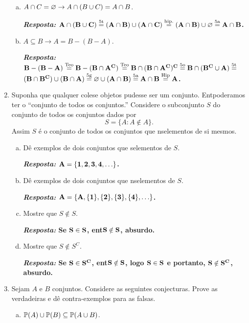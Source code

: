 \begin{enumerate}[{\bf 1.}]
\begin{enumerate}[a)]
\item $A\cap C=\varnothing \to A\cap(B\cup C)=A\cap B$.

{\bf{\it Resposta:} ${\bf A\cap(B\cup C)\stackrel{\text{5t}}{=}(A\cap B)\cup(A\cap C)\stackrel{\text{hip.}}{=}(A\cap B)\cup\varnothing\stackrel{\text{5a}}{=}A\cap B}$.}

\item $A\subseteq B \to A=B-(B-A)$.

{\bf{\it Resposta:} ${\bf B-(B-A)\stackrel{\text{Teo}}{=}B-(B\cap A^C)\stackrel{\text{Teo}}{=}B\cap(B\cap A^C)^C\stackrel{\text{5o}}{=}B\cap(B^C\cup A)\stackrel{\text{5t}}{=}}$ \\ ${\bf (B\cap B^C)\cup(B\cap A)\stackrel{\text{5g}}{=}\varnothing\cup(A\cap B)\stackrel{\text{5a}}{=}A\cap B\stackrel{\text{Hip}}{=}A}$.}
\end{enumerate}

\item Suponha que qualquer cole\cao se objetos pudesse ser um conjunto. Ent\ao poder\ih amos ter o ``conjunto de todos os conjuntos.'' Considere o subconjunto $S$ do conjunto de todos os conjuntos dados por
\[
S=\{A:A\notin A\}.
\]
Assim $S$ \'e o conjunto de todos os conjuntos que n\ao s\ao elementos de si mesmos.
\begin{enumerate}[a)]
\item D\^e exemplos de dois conjuntos que s\ao elementos de $S$.

{\bf{\it Resposta:} ${\bf A=\{1,2,3,4,\ldots\}}$.}

\item D\^e exemplos de dois conjuntos que n\ao s\ao elementos de $S$.

{\bf{\it Resposta:} ${\bf A=\{A,\{1\},\{2\},\{3\},\{4\},\ldots\}}$.}

\item Mostre que $S\notin S$.

{\bf{\it Resposta:} Se ${\bf S\in S}$, ent\ao ${\bf S\notin S}$, absurdo.}

\item Mostre que $S\notin S^C$.

{\bf{\it Resposta:} Se ${\bf S\in S^C}$, ent\ao ${\bf S\notin S}$, logo ${\bf S\in S}$ e portanto, ${\bf S\notin S^C}$, absurdo.}

\end{enumerate}

\item Sejam $A$ e $B$ conjuntos. Considere as seguintes conjecturas. Prove as verdadeiras e d\^e contra-exemplos para as falsas.
\begin{enumerate}[a)]
\item $\mathbb{P}(A)\cup\mathbb{P}(B)\subseteq\mathbb{P}(A\cup B)$.


\end{enumerate}
\end{enumerate}
